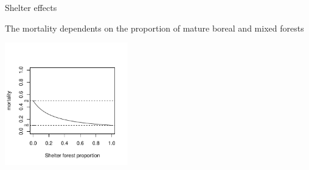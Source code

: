\documentclass[10pt,aspectratio=149]{beamer}
\begin{document}
\begin{frame}{Shelter effects}



The mortality dependents on the proportion of \alert{mature boreal and mixed} forests

\centering
\includegraphics[width=0.4\textwidth]{../graphs/shelter_effect.pdf}

\end{frame}
\end{document}
